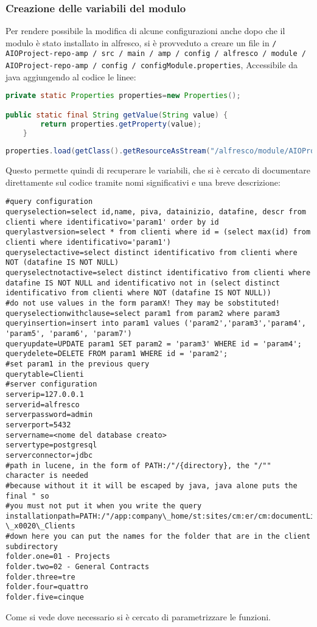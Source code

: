 \subsubsection{Creazione delle variabili del modulo}
Per rendere possibile la modifica di alcune configurazioni anche dopo che il modulo è stato installato in alfresco, si è provveduto a creare un file in \texttt{/ AIOProject-repo-amp / src / main / amp / config / alfresco / module / AIOProject-repo-amp / config / configModule.properties}, Accessibile da java aggiungendo al codice le linee:
\begin{lstlisting}[language=Java]
private static Properties properties=new Properties();

public static final String getValue(String value) {
		return properties.getProperty(value);
	}
	
properties.load(getClass().getResourceAsStream("/alfresco/module/AIOProject-repo-amp/config/configModule.properties"));
\end{lstlisting}
Questo permette quindi di recuperare le variabili, che si è cercato di documentare direttamente sul codice tramite nomi significativi e una breve descrizione:
\begin{lstlisting}
#query configuration
queryselection=select id,name, piva, datainizio, datafine, descr from clienti where identificativo='param1' order by id
querylastversion=select * from clienti where id = (select max(id) from clienti where identificativo='param1')
queryselectactive=select distinct identificativo from clienti where NOT (datafine IS NOT NULL)
queryselectnotactive=select distinct identificativo from clienti where datafine IS NOT NULL and identificativo not in (select distinct identificativo from clienti where NOT (datafine IS NOT NULL))
#do not use values in the form paramX! They may be sobstituted!
queryselectionwithclause=select param1 from param2 where param3
queryinsertion=insert into param1 values ('param2','param3','param4', 'param5', 'param6', 'param7')
queryupdate=UPDATE param1 SET param2 = 'param3' WHERE id = 'param4';
querydelete=DELETE FROM param1 WHERE id = 'param2';
#set param1 in the previous query
querytable=Clienti
#server configuration
serverip=127.0.0.1
serverid=alfresco
serverpassword=admin
serverport=5432
servername=<nome del database creato>
servertype=postgresql
serverconnector=jdbc
#path in lucene, in the form of PATH:/"/{directory}, the "/"" character is needed 
#because without it it will be escaped by java, java alone puts the final " so 
#you must not put it when you write the query
installationpath=PATH:/"/app:company\_home/st:sites/cm:er/cm:documentLibrary/cm:\_x0030\_2\_x0020\_-\_x0020\_Clients
#down here you can put the names for the folder that are in the client subdirectory
folder.one=01 - Projects
folder.two=02 - General Contracts
folder.three=tre
folder.four=quattro
folder.five=cinque
\end{lstlisting}
Come si vede dove necessario si è cercato di parametrizzare le funzioni.


